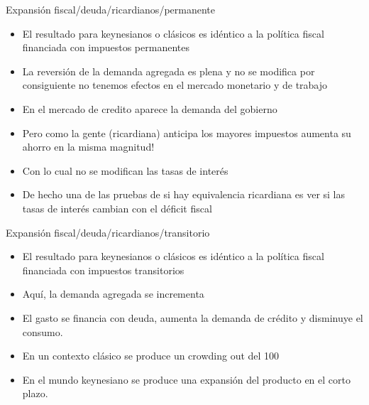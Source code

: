\documentclass{beamer}
\begin{document}
\begin{frame}{Expansión fiscal/deuda/ricardianos/permanente}   
\begin{itemize}
\item El resultado para keynesianos o clásicos es idéntico a la política fiscal financiada con impuestos permanentes
\item La reversión de la demanda agregada es plena y no se modifica por consiguiente no tenemos efectos en el mercado monetario y de trabajo
\item En el mercado de credito aparece la demanda del gobierno
\item Pero como la gente (ricardiana) anticipa los mayores impuestos aumenta su ahorro en la misma magnitud! 
\item Con lo cual no se modifican las tasas de interés 
\item De hecho una de las pruebas de si hay equivalencia ricardiana es ver si las tasas de interés cambian con el déficit fiscal
\end{itemize}    
\end{frame}



\begin{frame}{Expansión fiscal/deuda/ricardianos/transitorio}
\begin{itemize}
\item El resultado para keynesianos o clásicos es idéntico a la política fiscal financiada con impuestos transitorios
\item Aquí, la demanda agregada se incrementa 
\item El gasto se financia con deuda, aumenta la demanda de crédito y disminuye el consumo.
\item En un contexto clásico se produce un crowding out del 100%
\item En el mundo keynesiano se produce una expansión del producto en el corto plazo.
\end{itemize}
\end{frame}
\end{document}
